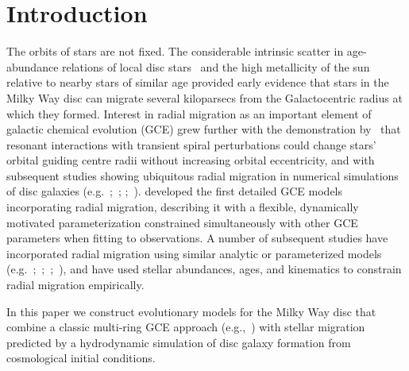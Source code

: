 \documentclass[draft2.tex]{subfiles}
\begin{document}
 

\section{Introduction} 
\label{sec:intro} 

The orbits of stars are not fixed. The considerable intrinsic scatter in 
age-abundance relations of local disc stars~\citep{Edvardsson1993} and the high 
metallicity of the sun relative to nearby stars of similar age 
\citep*{Wielen1996} provided early evidence that stars in the Milky Way disc 
can migrate several kiloparsecs from the Galactocentric radius at which they 
formed. 
Interest in radial migration as an important element of galactic chemical 
evolution (GCE) grew further with the demonstration by~\citet{Sellwood2002} 
that resonant interactions with transient spiral perturbations could 
change stars' orbital guiding centre radii without increasing orbital 
eccentricity, and with subsequent studies showing ubiquitous radial migration 
in numerical simulations of disc galaxies (e.g.~\citealp{Roskar2008a, 
Roskar2008b, Loebman2011, Minchev2011};~\citealp*{Bird2012}; 
\citealp{Bird2013};~\citealp*{Grand2012a, Grand2012b, Kubryk2013}). 
\citet{Schoenrich2009a,Schoenrich2009b} developed the first detailed GCE 
models incorporating radial migration, describing it with a flexible, 
dynamically motivated parameterization constrained simultaneously with other 
GCE parameters when fitting to observations. A number of subsequent studies 
have incorporated radial migration using similar analytic or parameterized 
models (e.g.~\citealp{Bilitewski2012, Hayden2015};~\citealp*{Kubryk2015a, 
Kubryk2015b};~\citealp{Feuillet2018};~\citealp*{Sharma2020}), and 
\citet{Frankel2018, Frankel2019, Frankel2020} have used stellar abundances, 
ages, and kinematics to constrain radial migration empirically. 
\par 
\null\par 
In this paper we construct evolutionary models for the Milky Way disc that 
combine a classic multi-ring GCE approach (e.g.,~\citealp{Matteucci1989, 
Wyse1989, Prantzos1995}) with stellar migration predicted by a 
hydrodynamic simulation of disc galaxy formation from cosmological initial 
conditions. 
\end{document}
